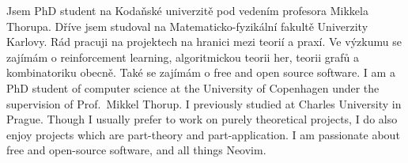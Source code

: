 \vspace{.5em}

\begin{center}
	\small
	\hspace{.5in}
	\hfill
	\hfill
	\hfill
	\hfill
	\hspace{.5in}

\end{center}

\begin{intro}
	\lng
	{
		Jsem PhD student na Kodaňské univerzitě pod vedením profesora Mikkela Thorupa.
		Dříve jsem studoval na Matematicko-fyzikální fakultě Univerzity Karlovy.
		Rád pracuji na projektech na hranici mezi teorií a praxí.
		Ve výzkumu se zajímám o reinforcement learning, algoritmickou teorii her, teorii grafů a kombinatoriku obecně.
		Také se zajímám o free and open source software.
	}{
		I am a PhD student of computer science at the University of Copenhagen under the supervision of Prof.\ Mikkel Thorup.
		I previously studied at Charles University in Prague.
		Though I usually prefer to work on purely theoretical projects, I do also enjoy projects which are part-theory and part-application.
		I am passionate about free and open-source software, and all things Neovim.
	}
\end{intro}


